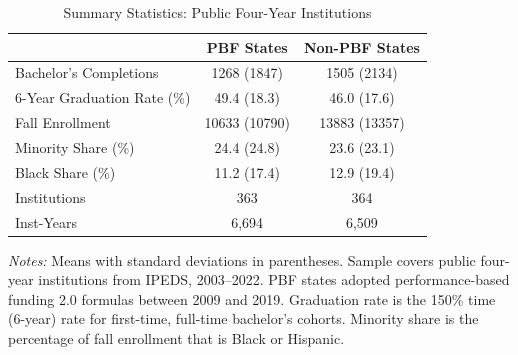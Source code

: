 \begin{table}[H]
\centering
\caption{Summary Statistics: Public Four-Year Institutions}
\label{tab:summary}
\begin{threeparttable}
\begin{tabular}{lcc}
\toprule
 & PBF States & Non-PBF States \\
\midrule
Bachelor's Completions  &  1268 (1847)  &  1505 (2134)  \\
6-Year Graduation Rate (\%)  &  49.4 (18.3)  &  46.0 (17.6)  \\
Fall Enrollment  &  10633 (10790)  &  13883 (13357)  \\
Minority Share (\%)  &  24.4 (24.8)  &  23.6 (23.1)  \\
Black Share (\%)  &  11.2 (17.4)  &  12.9 (19.4)  \\
Institutions  &  363  &  364  \\
Inst-Years  &  6,694  &  6,509  \\
\bottomrule
\end{tabular}
\begin{tablenotes}[flushleft]
\small
\item \textit{Notes:} Means with standard deviations in parentheses. Sample covers public four-year institutions from IPEDS, 2003--2022. PBF states adopted performance-based funding 2.0 formulas between 2009 and 2019. Graduation rate is the 150\% time (6-year) rate for first-time, full-time bachelor's cohorts. Minority share is the percentage of fall enrollment that is Black or Hispanic.
\end{tablenotes}
\end{threeparttable}
\end{table}
